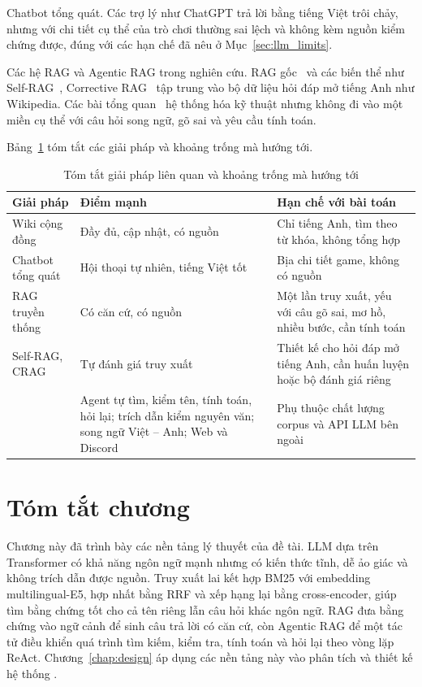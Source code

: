 Chatbot tổng quát. Các trợ lý như ChatGPT trả lời bằng tiếng Việt trôi chảy, nhưng với chi tiết cụ thể của trò chơi thường sai lệch và không kèm nguồn kiểm chứng được, đúng với các hạn chế đã nêu ở Mục~\ref{sec:llm_limits}.

Các hệ RAG và Agentic RAG trong nghiên cứu. RAG gốc~\cite{lewis2020rag} và các biến thể như Self-RAG~\cite{asai2024selfrag}, Corrective RAG~\cite{yan2024crag} tập trung vào bộ dữ liệu hỏi đáp mở tiếng Anh như Wikipedia. Các bài tổng quan~\cite{gao2023ragsurvey,singh2025agenticrag} hệ thống hóa kỹ thuật nhưng không đi vào một miền cụ thể với câu hỏi song ngữ, gõ sai và yêu cầu tính toán.

Bảng~\ref{tab:related} tóm tắt các giải pháp và khoảng trống mà \IB{} hướng tới.

\begin{table}[H]
    \centering
    \caption{Tóm tắt giải pháp liên quan và khoảng trống mà \IB{} hướng tới}
    \label{tab:related}
    \small
    \begin{tabularx}{\textwidth}{|>{\raggedright\arraybackslash}p{3.3cm}|>{\raggedright\arraybackslash}X|>{\raggedright\arraybackslash}X|}
        \toprule
        \textbf{Giải pháp} & \textbf{Điểm mạnh} & \textbf{Hạn chế với bài toán} \\
        \midrule
        Wiki cộng đồng & Đầy đủ, cập nhật, có nguồn & Chỉ tiếng Anh, tìm theo từ khóa, không tổng hợp \\ \hline
        Chatbot tổng quát & Hội thoại tự nhiên, tiếng Việt tốt & Bịa chi tiết game, không có nguồn \\ \hline
        RAG truyền thống & Có căn cứ, có nguồn & Một lần truy xuất, yếu với câu gõ sai, mơ hồ, nhiều bước, cần tính toán \\ \hline
        Self-RAG, CRAG & Tự đánh giá truy xuất & Thiết kế cho hỏi đáp mở tiếng Anh, cần huấn luyện hoặc bộ đánh giá riêng \\ \hline
        \textbf{\IB{}} & Agent tự tìm, kiểm tên, tính toán, hỏi lại; trích dẫn kiểm nguyên văn; song ngữ Việt -- Anh; Web và Discord & Phụ thuộc chất lượng corpus và API LLM bên ngoài \\
        \bottomrule
    \end{tabularx}
\end{table}

\section{Tóm tắt chương}
\label{sec:ch1_summary}

Chương này đã trình bày các nền tảng lý thuyết của đề tài. LLM dựa trên Transformer có khả năng ngôn ngữ mạnh nhưng có kiến thức tĩnh, dễ ảo giác và không trích dẫn được nguồn. Truy xuất lai kết hợp BM25 với embedding multilingual-E5, hợp nhất bằng RRF và xếp hạng lại bằng cross-encoder, giúp tìm bằng chứng tốt cho cả tên riêng lẫn câu hỏi khác ngôn ngữ. RAG đưa bằng chứng vào ngữ cảnh để sinh câu trả lời có căn cứ, còn Agentic RAG để một tác tử điều khiển quá trình tìm kiếm, kiểm tra, tính toán và hỏi lại theo vòng lặp ReAct. Chương~\ref{chap:design} áp dụng các nền tảng này vào phân tích và thiết kế hệ thống \IB{}.
